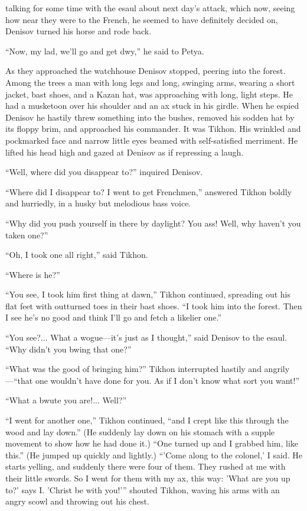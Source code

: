  talking for some time with the esaul about next day's
attack, which now, seeing how near they were to the French, he
seemed to have definitely decided on, Denisov turned his horse
and rode back.

``Now, my lad, we'll go and get dwy,'' he said to Petya.

As they approached the watchhouse Denisov stopped, peering into
the forest. Among the trees a man with long legs and long,
swinging arms, wearing a short jacket, bast shoes, and a Kazan
hat, was approaching with long, light steps. He had a musketoon
over his shoulder and an ax stuck in his girdle. When he espied
Denisov he hastily threw something into the bushes, removed his
sodden hat by its floppy brim, and approached his commander. It
was Tikhon. His wrinkled and pockmarked face and narrow little
eyes beamed with self-satisfied merriment. He lifted his head
high and gazed at Denisov as if repressing a laugh.

``Well, where did you disappear to?'' inquired Denisov.

``Where did I disappear to? I went to get Frenchmen,'' answered
Tikhon boldly and hurriedly, in a husky but melodious bass voice.

``Why did you push yourself in there by daylight? You ass! Well,
why haven't you taken one?''

``Oh, I took one all right,'' said Tikhon.

``Where is he?''

``You see, I took him first thing at dawn,'' Tikhon continued,
spreading out his flat feet with outturned toes in their bast
shoes. ``I took him into the forest. Then I see he's no good and
think I'll go and fetch a likelier one.''

``You see?... What a wogue---it's just as I thought,'' said
Denisov to the esaul. ``Why didn't you bwing that one?''

``What was the good of bringing him?'' Tikhon interrupted hastily
and angrily---``that one wouldn't have done for you. As if I
don't know what sort you want!''

``What a bwute you are!... Well?''

``I went for another one,'' Tikhon continued, ``and I crept like
this through the wood and lay down.'' (He suddenly lay down on
his stomach with a supple movement to show how he had done it.)
``One turned up and I grabbed him, like this.'' (He jumped up
quickly and lightly.) ``'Come along to the colonel,' I said. He
starts yelling, and suddenly there were four of them. They rushed
at me with their little swords. So I went for them with my ax,
this way: 'What are you up to?' says I. 'Christ be with you!'{}''
shouted Tikhon, waving his arms with an angry scowl and throwing
out his chest.

